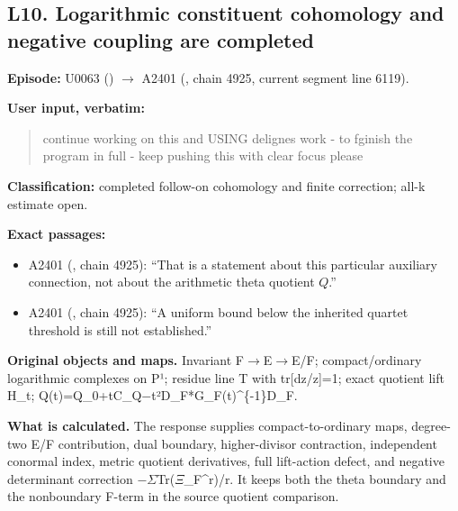 \subsection{L10. Logarithmic constituent cohomology and negative
coupling are
completed}\label{TranscriptLedgerStage:l10.-logarithmic-constituent-cohomology-and-negative-coupling-are-completed}

\textbf{Episode:} U0063
(\protect{})
\allowbreak{}\ensuremath{→}\allowbreak{} A2401
(\protect{}, chain 4925,
current segment line 6119).

\textbf{User input, verbatim:}

\begin{quote}
continue working on this and USING delignes work - to fginish the
program in full - keep pushing this with clear focus please
\end{quote}

\textbf{Classification:} completed follow-on cohomology and finite
correction; all-k estimate open.

\textbf{Exact passages:}

\begin{itemize}
\tightlist
\item
  A2401 (\protect{}, chain
  4925): ``That is a statement about this particular auxiliary
  connection, not about the arithmetic theta quotient \(Q\).''
\item
  A2401 (\protect{}, chain
  4925): ``A uniform bound below the inherited quartet threshold is
  still not established.''
\end{itemize}

\textbf{Original objects and maps.} Invariant
F\allowbreak{}\ensuremath{→}\allowbreak{}E\allowbreak{}\ensuremath{→}\allowbreak{}E/F;
compact/ordinary logarithmic complexes on P¹; residue line T with
tr{[}dz/z{]}=1; exact quotient lift H\_t;
Q(t)=Q\_0+tC\_Q\allowbreak{}\ensuremath{−}\allowbreak{}t²D\_F*G\_F(t)\textasciicircum{}\{-1\}D\_F.

\textbf{What is calculated.} The response supplies compact-to-ordinary
maps, degree-two E/F contribution, dual boundary, higher-divisor
contraction, independent conormal index, metric quotient derivatives,
full lift-action defect, and negative determinant correction
\allowbreak{}\ensuremath{−}\allowbreak{}\allowbreak{}\ensuremath{Σ}\allowbreak{}Tr(\allowbreak{}\ensuremath{Ξ}\allowbreak{}\_F\textasciicircum{}r)/r.
It keeps both the theta boundary and the nonboundary F-term in the
source quotient comparison.

